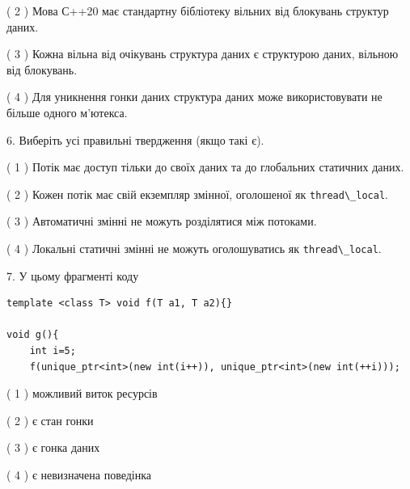 \documentclass[12pt, ukrainian]{article}
\def\code#1{\Verb!#1!}
\begin{document}
\begin {large}
{( 2 ) Мова С++20 має стандартну бібліотеку вільних від блокувань структур даних.%

( 3 ) Кожна вільна від очікувань структура даних є структурою даних, вільною від блокувань.%

( 4 ) Для уникнення гонки даних структура даних може використовувати не більше одного м’ютекса.%
\newpage



\vspace{5mm}
6. Виберіть усі правильні твердження (якщо такі є).\par
\vspace{2mm}

( 1 ) Потік має доступ тільки до своїх даних та до глобальних статичних даних.%

( 2 ) Кожен потік має свій екземпляр змінної, оголошеної як \code{thread\_local}.%

( 3 ) Автоматичні змінні не можуть розділятися між потоками.%

( 4 ) Локальні статичні змінні не можуть оголошуватись як \code{thread\_local}.%


\vspace{5mm}
7. У цьому фрагменті коду
\begin{verbatim}
template <class T> void f(T a1, T a2){}

void g(){
    int i=5;
    f(unique_ptr<int>(new int(i++)), unique_ptr<int>(new int(++i)));
\end{verbatim}

( 1 ) можливий виток ресурсів%

( 2 ) є стан гонки%

( 3 ) є гонка даних%

( 4 ) є невизначена поведінка%
}
\end {large}
\end{document}
